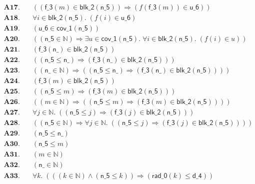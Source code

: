 \documentclass[11pt]{article}
\begin{document}
\begin{align*}
  \mathbf{A17.}\quad & ((\mathsf{f\_3}(m) \in \mathsf{blk\_2}(\mathsf{n\_5})) \Rightarrow (f(\mathsf{f\_3}(m)) \in \mathsf{u\_6})) \\
  \mathbf{A18.}\quad & \forall i \in \mathsf{blk\_2}(\mathsf{n\_5}).\; (f(i) \in \mathsf{u\_6}) \\
  \mathbf{A19.}\quad & (\mathsf{u\_6} \in \mathsf{cov\_1}(\mathsf{n\_5})) \\
  \mathbf{A20.}\quad & ((\mathsf{n\_5} \in \mathbb{N}) \Rightarrow \exists u \in \mathsf{cov\_1}(\mathsf{n\_5}).\; \forall i \in \mathsf{blk\_2}(\mathsf{n\_5}).\; (f(i) \in u)) \\
  \mathbf{A21.}\quad & (\mathsf{f\_3}(\mathsf{n\_}) \in \mathsf{blk\_2}(\mathsf{n\_5})) \\
  \mathbf{A22.}\quad & ((\mathsf{n\_5} \leq \mathsf{n\_}) \Rightarrow (\mathsf{f\_3}(\mathsf{n\_}) \in \mathsf{blk\_2}(\mathsf{n\_5}))) \\
  \mathbf{A23.}\quad & ((\mathsf{n\_} \in \mathbb{N}) \Rightarrow ((\mathsf{n\_5} \leq \mathsf{n\_}) \Rightarrow (\mathsf{f\_3}(\mathsf{n\_}) \in \mathsf{blk\_2}(\mathsf{n\_5})))) \\
  \mathbf{A24.}\quad & (\mathsf{f\_3}(m) \in \mathsf{blk\_2}(\mathsf{n\_5})) \\
  \mathbf{A25.}\quad & ((\mathsf{n\_5} \leq m) \Rightarrow (\mathsf{f\_3}(m) \in \mathsf{blk\_2}(\mathsf{n\_5}))) \\
  \mathbf{A26.}\quad & ((m \in \mathbb{N}) \Rightarrow ((\mathsf{n\_5} \leq m) \Rightarrow (\mathsf{f\_3}(m) \in \mathsf{blk\_2}(\mathsf{n\_5})))) \\
  \mathbf{A27.}\quad & \forall j \in \mathbb{N}.\; ((\mathsf{n\_5} \leq j) \Rightarrow (\mathsf{f\_3}(j) \in \mathsf{blk\_2}(\mathsf{n\_5}))) \\
  \mathbf{A28.}\quad & ((\mathsf{n\_5} \in \mathbb{N}) \Rightarrow \forall j \in \mathbb{N}.\; ((\mathsf{n\_5} \leq j) \Rightarrow (\mathsf{f\_3}(j) \in \mathsf{blk\_2}(\mathsf{n\_5})))) \\
  \mathbf{A29.}\quad & (\mathsf{n\_5} \leq \mathsf{n\_}) \\
  \mathbf{A30.}\quad & (\mathsf{n\_5} \leq m) \\
  \mathbf{A31.}\quad & (m \in \mathbb{N}) \\
  \mathbf{A32.}\quad & (\mathsf{n\_} \in \mathbb{N}) \\
  \mathbf{A33.}\quad & \forall k.\; (((k \in \mathbb{N}) \wedge (\mathsf{n\_5} \leq k)) \Rightarrow (\mathsf{rad\_0}(k) \leq \mathsf{d\_4})) \\

\end{align*}
\end{document}
